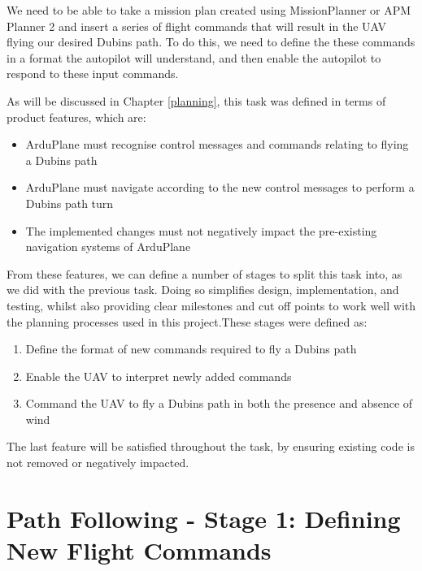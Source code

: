 We need to be able to take a mission plan created using MissionPlanner or APM Planner 2 and insert a series of flight commands that will result in the UAV flying our desired Dubins path. To do this, we need to define the these commands in a format the autopilot will understand, and then enable the autopilot to respond to these input commands. 

As will be discussed in Chapter \ref{planning}, this task was defined in terms of product features, which are:


\begin{itemize}
	\item ArduPlane must recognise control messages and commands relating to flying a Dubins path
	\item ArduPlane must navigate according to the new control messages to perform a Dubins path turn
	\item The implemented changes must not negatively impact the pre-existing navigation systems of ArduPlane
\end{itemize}

From these features, we can define a number of stages to split this task into, as we did with the previous task. Doing so simplifies design, implementation, and testing, whilst also providing clear milestones and cut off points to work well with the planning processes used in this project.These stages were defined as:

\begin{enumerate}
	\item Define the format of new commands required to fly a Dubins path
	\item Enable the UAV to interpret newly added commands
	\item Command the UAV to fly a Dubins path in both the presence and absence of wind
\end{enumerate}

The last feature will be satisfied throughout the task, by ensuring existing code is not removed or negatively impacted. 

\section{Path Following - Stage 1: Defining New Flight Commands}
\label{task2:stage1}


